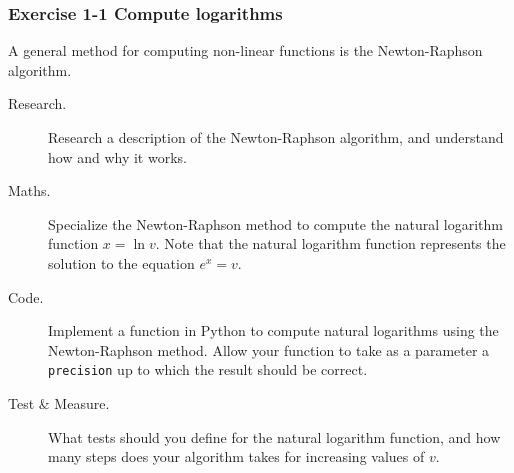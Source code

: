 \documentclass{beamer} %
\begin{document}
\begin{frame}
\frametitle{Exercise 1-1 Compute logarithms}

A general method for computing non-linear functions is the Newton-Raphson algorithm.
\begin{description}
	\item[Research.] Research a description of the Newton-Raphson algorithm, and understand how and why it works.
	\item[Maths.] Specialize the Newton-Raphson method to compute the natural logarithm function $x = \ln v$. Note that the natural logarithm function represents the solution to the equation $e^x = v$.
	\item[Code.] Implement a function in Python to compute natural logarithms using the Newton-Raphson method. Allow your function to take as a parameter a \texttt{precision} up to which the result should be correct.
	\item[Test \& Measure.] What tests should you define for the natural logarithm function, and how many steps does your algorithm takes for increasing values of $v$.

\end{description}

\end{frame}




\end{document}
